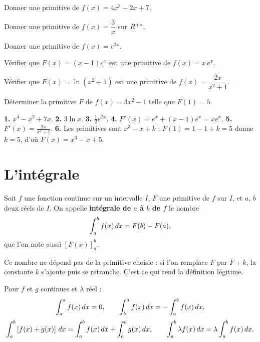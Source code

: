 \begin{entrainement}[primitives]
\exo[\niveau{1}] Donner une primitive de $f(x) = 4x^{3}-2x+7$.

\exo[\niveau{1}] Donner une primitive de $f(x) = \dfrac{3}{x}$ sur
$R^{+*}$.

\exo[\niveau{2}] Donner une primitive de $f(x) = e^{2x}$.

\exo[\niveau{2}] Vérifier que $F(x) = (x-1)e^{x}$ est une primitive de
$f(x) = x\,e^{x}$.

\exo[\niveau{2}] Vérifier que $F(x) = \ln\left(x^{2}+1\right)$ est une
primitive de $f(x) = \dfrac{2x}{x^{2}+1}$.

\exo[\niveau{3}] Déterminer la primitive $F$ de $f(x) = 3x^{2}-1$ telle que
$F(1) = 5$.
\end{entrainement}

\begin{corrige}[primitives]
\textbf{1.} $x^{4}-x^{2}+7x$.
\textbf{2.} $3\ln x$.
\textbf{3.} $\frac12e^{2x}$.
\textbf{4.} $F'(x) = e^{x}+(x-1)e^{x} = xe^{x}$. \checkmark
\textbf{5.} $F'(x) = \frac{2x}{x^{2}+1}$. \checkmark
\textbf{6.} Les primitives sont $x^{3}-x+k$ ; $F(1) = 1-1+k = 5$ donne
$k = 5$, d'où $F(x) = x^{3}-x+5$.
\end{corrige}

\section{L'intégrale}

\begin{definition}
Soit $f$ une fonction continue sur un intervalle $I$, $F$ une primitive de
$f$ sur $I$, et $a$, $b$ deux réels de $I$. On appelle \textbf{intégrale de
$a$ à $b$ de $f$} le nombre
\[
  \int_{a}^{b} f(x)\,dx = F(b)-F(a),
\]
que l'on note aussi $\left[F(x)\right]_{a}^{b}$.
\end{definition}

\begin{remarque}
Ce nombre ne dépend pas de la primitive choisie : si l'on remplace $F$ par
$F+k$, la constante $k$ s'ajoute puis se retranche. C'est ce qui rend la
définition légitime.
\end{remarque}

\begin{propriete}
Pour $f$ et $g$ continues et $\lambda$ réel :
\[
  \int_{a}^{a} f(x)\,dx = 0, \qquad
  \int_{b}^{a} f(x)\,dx = -\int_{a}^{b} f(x)\,dx,
\]
\[
  \int_{a}^{b}\left[f(x)+g(x)\right]\,dx
  = \int_{a}^{b} f(x)\,dx+\int_{a}^{b} g(x)\,dx, \qquad
  \int_{a}^{b} \lambda f(x)\,dx = \lambda\int_{a}^{b} f(x)\,dx .
\]
\end{propriete}

